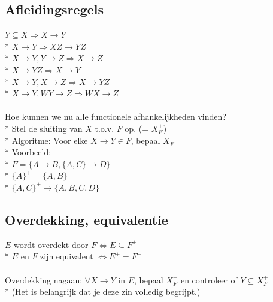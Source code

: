 \documentclass[10pt]{article}
\begin{document}
\subsection{Afleidingsregels}
$Y \subseteq X \Rightarrow X \rightarrow Y$\\*
$X \rightarrow Y \Rightarrow XZ \rightarrow YZ$\\*
$X \rightarrow Y, Y \rightarrow Z \Rightarrow X \rightarrow Z$\\*
$X \rightarrow YZ \Rightarrow X \rightarrow Y$\\*
$X \rightarrow Y, X \rightarrow Z \Rightarrow X \rightarrow YZ$\\*
$X \rightarrow Y, WY \rightarrow Z \Rightarrow WX \rightarrow Z$\\\\
Hoe kunnen we nu alle functionele afhankelijkheden vinden?\\*
Stel de sluiting van $X$ t.o.v. $F$ op. (= $X_F^+$)\\*
Algoritme: Voor elke $X \rightarrow Y \in F$, bepaal $X_F^+$\\*
Voorbeeld:\\*
$F = \{A \rightarrow B, \{A, C\} \rightarrow D\}$\\*
$\{A\}^+ = \{A, B\}$\\*
$\{A, C\}^+ \rightarrow \{A, B, C, D\}$
\subsection{Overdekking, equivalentie}
$E$ wordt overdekt door $F \Leftrightarrow E \subseteq F^+$\\*
$E$ en $F$ zijn equivalent $\Leftrightarrow E^+ = F^+$\\\\
Overdekking nagaan: $\forall X \rightarrow Y$ in $E$, bepaal $X_F^+$ en controleer of $Y \subseteq X_F^+$\\*
(Het is belangrijk dat je deze zin volledig begrijpt.)
\end{document}
